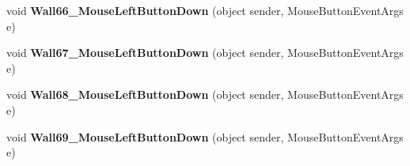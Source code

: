 \begin{DoxyCompactItemize}
void {\bfseries Wall66\+\_\+\+Mouse\+Left\+Button\+Down} (object sender, Mouse\+Button\+Event\+Args e)
\item 
\mbox{\label{class_r6_1_1_border_window_a04fea896e193e90336243a572dc66879}} 
void {\bfseries Wall67\+\_\+\+Mouse\+Left\+Button\+Down} (object sender, Mouse\+Button\+Event\+Args e)
\item 
\mbox{\label{class_r6_1_1_border_window_a33b850a359700703905ea7a698873f14}} 
void {\bfseries Wall68\+\_\+\+Mouse\+Left\+Button\+Down} (object sender, Mouse\+Button\+Event\+Args e)
\item 
\mbox{\label{class_r6_1_1_border_window_ae83d0e2e6edf54c65b1197f6272d0c1c}} 
void {\bfseries Wall69\+\_\+\+Mouse\+Left\+Button\+Down} (object sender, Mouse\+Button\+Event\+Args e)
\end{DoxyCompactItemize}
